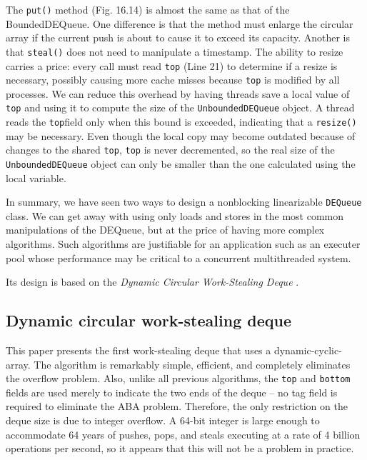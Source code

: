 The \lstinline!put()! method (Fig. 16.14) is almost the same as that
of the BoundedDEQueue. One difference is that the method must enlarge
the circular array if the current push is about to cause it to exceed
its capacity. Another is that \lstinline!steal()! does not need to
manipulate a timestamp. The ability to resize carries a price: every
call must read \lstinline!top! (Line 21) to determine if a resize is
necessary, possibly causing more cache misses because \lstinline!top!
is modified by all processes. We can reduce this overhead by having
threads save a local value of \lstinline!top! and using it to compute
the size of the \lstinline!UnboundedDEQueue!  object. A thread reads
the \lstinline!top!field only when this bound is exceeded, indicating
that a \lstinline!resize()! may be necessary.  Even though the local
copy may become outdated because of changes to the shared
\lstinline!top!, \lstinline!top! is never decremented, so the real
size of the \lstinline!UnboundedDEQueue! object can only be smaller
than the one calculated using the local variable.





In summary, we have seen two ways to design a nonblocking linearizable
\lstinline!DEQueue! class. We can get away with using only loads and
stores in the most common manipulations of the DEQueue, but at the
price of having more complex algorithms. Such algorithms are
justifiable for an application such as an executer pool whose
performance may be critical to a concurrent multithreaded system.


Its design is based on the \emph{Dynamic Circular Work-Stealing Deque}
\cite{Chase2005, Lev2005}.

\subsection{Dynamic circular work-stealing deque \cite{Chase2005}}

This paper presents the first work-stealing deque that uses a
dynamic-cyclic-array. The algorithm is remarkably simple, efficient,
and completely eliminates the overflow problem. Also, unlike all
previous algorithms, the \lstinline!top! and \lstinline!bottom! fields
are used merely to indicate the two ends of the deque -- no tag field
is required to eliminate the ABA problem. Therefore, the only
restriction on the deque size is due to integer overflow. A 64-bit
integer is large enough to accommodate 64 years of pushes, pops, and
steals executing at a rate of 4 billion operations per second, so it
appears that this will not be a problem in practice.

